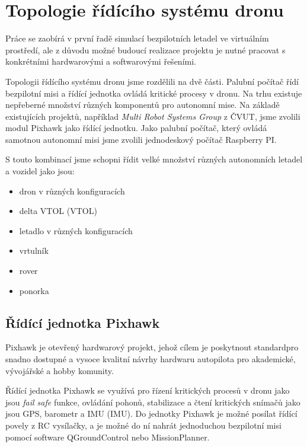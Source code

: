 \chapter{Topologie řídícího systému dronu}

Práce se zaobírá v první řadě simulací bezpilotních letadel ve virtuálním prostředí, ale z důvodu možné budoucí realizace projektu je nutné pracovat s konkrétními hardwarovými a softwarovými řešeními.

Topologii řídícího systému dronu jsme rozdělili na dvě části. Palubní počítač řídí bezpilotní misi a řídící jednotka ovládá kritické procesy v dronu. Na trhu existuje nepřeberné množství různých komponentů pro autonomní mise. Na základě existujících projektů, například \textit{Multi Robot Systems Group} z ČVUT, \cite{MRS} jsme zvolili modul Pixhawk jako řídící jednotku. Jako palubní počítač, který ovládá samotnou autonomní misi jsme zvolili jednodeskový počítač Raspberry PI.

S touto kombinací jsme schopni řídit velké množství různých autonomních letadel a vozidel jako jsou:

\begin{itemize}
    \item dron v různých konfiguracích
    \item delta \acs{VTOL} (\acl{VTOL})
    \item letadlo v různých konfiguracích
    \item vrtulník
    \item rover
    \item ponorka
\end{itemize}

\section{Řídící jednotka Pixhawk}

Pixhawk je otevřený hardwarový projekt, jehož cílem je poskytnout standard\break pro snadno dostupné a vysoce kvalitní návrhy hardwaru autopilota pro akademické, vývojářské a hobby komunity. \cite{PIX1}

Řídící jednotka Pixhawk se využívá pro řízení kritických procesů v dronu jako jsou \textit{fail safe} funkce, ovládání pohonů, stabilizace a čtení kritických snímačů jako jsou GPS, barometr a \acs{IMU} (\acl{IMU}). Do jednotky Pixhawk je možné posílat řídící povely z RC vysílačky, a je možné do ní nahrát jednoduchou bezpilotní misi pomocí software QGroundControl nebo MissionPlanner.

